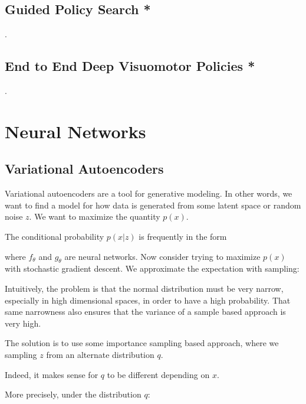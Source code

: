 \documentclass[12pt]{article}
\begin{document}
\subsection{Guided Policy Search *}
.
\subsection{End to End Deep Visuomotor Policies *}
.
\section{Neural Networks}

\subsection{Variational Autoencoders}

Variational autoencoders are a tool for generative modeling. In other words, we want to find a model for how data is generated from some latent space or random noise $z$. We want to maximize the quantity $p(x)$.


The conditional probability $p(x|z)$ is frequently in the form


where $f_\theta$ and $g_\theta$ are neural networks. Now consider trying to maximize $p(x)$ with stochastic gradient descent. We approximate the expectation with sampling:


Intuitively, the problem is that the normal distribution must be very narrow, especially in high dimensional spaces, in order to have a high probability. That same narrowness also ensures that the variance of a sample based approach is very high.

The solution is to use some importance sampling based approach, where we sampling $z$ from an alternate distribution $q$. 


Indeed, it makes sense for $q$ to be different depending on $x$. 


More precisely, under the distribution $q$:

\end{document}
